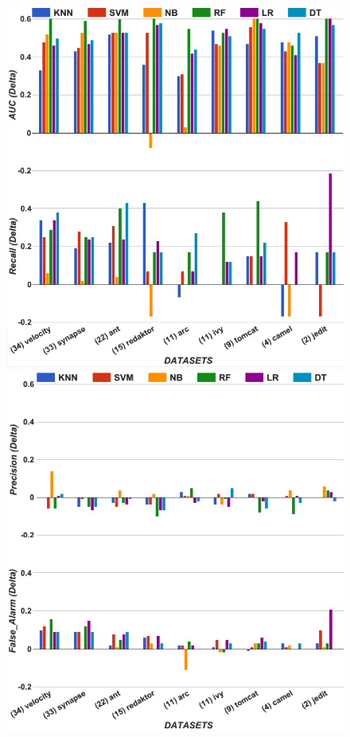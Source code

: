 \begin{figure}[!t]
\begin{minipage}{.5\linewidth}
\centering
        \includegraphics[width=.95\linewidth]{./fig/AUC_recall_tuned.png}
    \end{minipage}%
\begin{minipage}{.5\linewidth}
        \centering
        \includegraphics[width=.95\linewidth]{./fig/prec_pf_tuned.png}
    \end{minipage}%
    

\end{figure}
